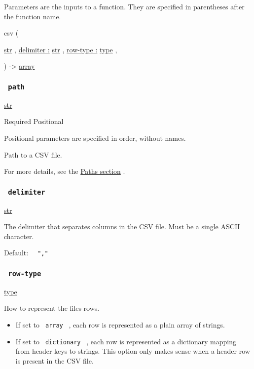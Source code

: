 \label{parameters-tooltip}
Parameters are the inputs to a function. They are specified in
parentheses after the function name.

{ csv } (

{ \href{/docs/reference/foundations/str/}{str} , } {
\hyperref[parameters-delimiter]{delimiter :}
\href{/docs/reference/foundations/str/}{str} , } {
\hyperref[parameters-row-type]{row-type :}
\href{/docs/reference/foundations/type/}{type} , }

) -\textgreater{} \href{/docs/reference/foundations/array/}{array}

\subsubsection{\texorpdfstring{\texttt{\ path\ }}{ path }}\label{parameters-path}

\href{/docs/reference/foundations/str/}{str}

{Required} {{ Positional }}

\label{parameters-path-positional-tooltip}
Positional parameters are specified in order, without names.

Path to a CSV file.

For more details, see the \href{/docs/reference/syntax/\#paths}{Paths
section} .

\subsubsection{\texorpdfstring{\texttt{\ delimiter\ }}{ delimiter }}\label{parameters-delimiter}

\href{/docs/reference/foundations/str/}{str}

The delimiter that separates columns in the CSV file. Must be a single
ASCII character.

Default: \texttt{\ }{\texttt{\ ","\ }}\texttt{\ }

\subsubsection{\texorpdfstring{\texttt{\ row-type\ }}{ row-type }}\label{parameters-row-type}

\href{/docs/reference/foundations/type/}{type}

How to represent the file\textquotesingle s rows.

\begin{itemize}
\tightlist
\item
  If set to \texttt{\ array\ } , each row is represented as a plain
  array of strings.
\item
  If set to \texttt{\ dictionary\ } , each row is represented as a
  dictionary mapping from header keys to strings. This option only makes
  sense when a header row is present in the CSV file.
\end{itemize}

